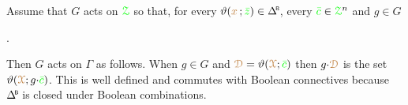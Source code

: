 Assume that $G$ acts on ${\color{green}\EuScript Z}$ so that, for every $\theta({\mr x}\,;{\gr\bar z})\in\BDelta$, every ${\color{green}\bar c}\in{\color{green}\EuScript Z}^n$ and $g\in G$

.

Then $G$ acts on $\Gamma$ as follows.
When $g\in G$ and ${\color{brown}\EuScript D}=\vartheta({\color{brown}\EuScript X};{\color{green}\bar c})$ then $g{\cdot}{\color{brown}\EuScript D}$ is the set $\vartheta({\color{brown}\EuScript X};g{\cdot}{\color{green}\bar c})$.
This is well defined and commutes with Boolean connectives because $\BDelta$ is closed under Boolean combinations.








  



